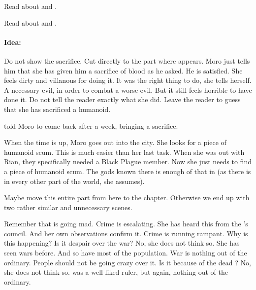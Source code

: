 
Read about  and . 

Read about  and . 

\paragraph{Idea:}
Do not show the sacrifice. 
Cut directly to the part where \Nasshikerr appears. 
Moro just tells him that she has given him a sacrifice of blood as he asked. 
He is satisfied.
She feels dirty and villanous for doing it.
It was the right thing to do, she tells herself.
A necessary evil, in order to combat a worse evil. 
But it still feels horrible to have done it.
Do not tell the reader exactly what she did.
Leave the reader to guess that she has sacrificed a humanoid. 

\begin{comment}
  \section{Moro searches}
\end{comment}



\begin{comment}
  \subsection{Looking for victims}
\end{comment}
\Nasshikerr told Moro to come back after a week, bringing a sacrifice. 

When the time is up, Moro goes out into the city.
She looks for a piece of humanoid scum. 
This is much easier than her last task.
When she was out with Rian, they specifically needed a Black Plague member. 
Now she just needs to find a piece of humanoid scum.
The gods known there is enough of that in \Malcur (as there is in every other part of the world, she assumes). 

Maybe move this entire part from here to the  chapter.
Otherwise we end up with two rather similar and unnecessary scenes. 

Remember that \Malcur is going mad. 
Crime is escalating. 
She has heard this from the \rinyuth's council. 
And her own observations confirm it.
Crime is running rampant. 
Why is this happening?
Is it despair over the war?
No, she does not think so. 
She has seen wars before. 
And so have most of the population.
War is nothing out of the ordinary. 
People should not be going crazy over it. 
Is it because of the dead \rayuth?
No, she does not think so.
\Icor was a well-liked ruler, but again, nothing out of the ordinary. 

